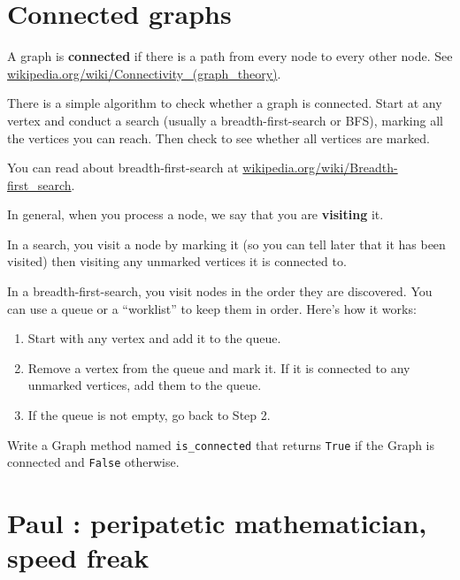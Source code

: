 \documentclass[10pt]{book}
\begin{document}
\section{Connected graphs}
\label{bfs}

A graph is {\bf connected} if there is a path from every node to every
other node.  See \url{wikipedia.org/wiki/Connectivity_(graph_theory)}.

There is a simple algorithm to check whether a graph is connected.
Start at any vertex and conduct a search
(usually a breadth-first-search or BFS), marking all the vertices you
can reach.  Then check to see whether all vertices are marked.

You can read about breadth-first-search at
\url{wikipedia.org/wiki/Breadth-first_search}.

In general, when you process
a node, we say that you are
{\bf visiting} it.

In a search, you visit a node
by marking it (so you can tell later that it has been visited)
then visiting any
unmarked vertices it is connected to.

In a breadth-first-search, you visit nodes in the order they are
discovered.  You can use a queue or a ``worklist'' to keep them in
order.  Here's how it works:

\begin{enumerate}

\item Start with any vertex and add it to the queue.

\item Remove a vertex from the queue and mark it.  If it is
connected to any unmarked vertices, add them to the queue.

\item If the queue is not empty, go back to Step 2.

\end{enumerate}

\begin{exercise}

Write a Graph method named \verb"is_connected" that returns
{\tt True} if the Graph is connected and {\tt False} otherwise.

\end{exercise}


\section{Paul \Erdos: peripatetic mathematician, speed freak}
\end{document}
